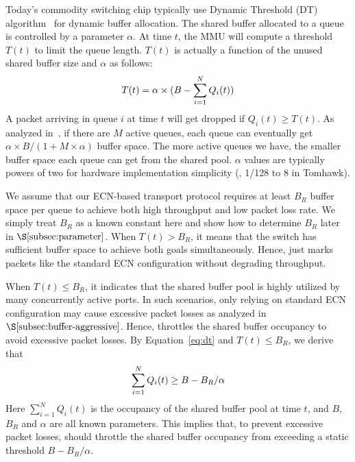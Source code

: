 Today's commodity switching chip typically use Dynamic Threshold (DT) algorithm~\cite{dt} for dynamic buffer allocation. The shared buffer allocated to a queue is controlled by a parameter $\alpha$. At time $t$, the MMU will compute a threshold $T(t)$ to limit the queue length. $T(t)$ is actually a function of the unused shared buffer size and $\alpha$ as follows:
\vspace{-3mm}
\begin{equation}
\vspace{-2mm}
T(t)=\alpha\times(B-\displaystyle\sum_{i=1}^{N} Q_{i}(t))\label{eq:dt}
\vspace{-1mm}
\end{equation}
A packet arriving in queue $i$ at time $t$ will get dropped if $Q_{i}(t)\geq T(t)$. As analyzed in~\cite{dt}, if there are $M$ active queues, each queue can eventually get $\alpha\times B/(1+M\times \alpha)$ buffer space. The more active queues we have, the smaller buffer space each queue can get from the shared pool. $\alpha$ values are typically powers of two for hardware implementation simplicity (\eg, 1/128 to 8 in Tomhawk).

We assume that our ECN-based transport protocol requires at least $B_R$ buffer space per queue to achieve both high throughput and low packet loss rate. We simply treat $B_R$ as a known constant here and show how to determine $B_R$ later in $\S\ref{subsec:parameter}$. When $T(t) > B_R$, it means that the switch has sufficient buffer space to achieve both goals simultaneously. Hence, \sys just marks packets like the standard ECN configuration without degrading throughput.

When $T(t) \leq B_R$, it indicates that the shared buffer pool is highly utilized by many concurrently active ports. In such scenarios, only relying on standard ECN configuration may cause excessive packet losses as analyzed in $\S\ref{subsec:buffer-aggressive}$. Hence, \sys throttles the shared buffer occupancy to avoid excessive packet losses. By Equation~\ref{eq:dt} and $T(t)\leq B_R$, we derive that
\vspace{-3mm}
\begin{equation}
\vspace{-3mm}
\displaystyle\sum_{i=1}^{N} Q_{i}(t)\geq B-B_{R}/\alpha\label{eq:shared_buffer}
\vspace{-3mm}
\end{equation}
Here $\displaystyle\sum_{i=1}^{N} Q_{i}(t)$ is the occupancy of the shared buffer pool at time $t$, and $B$, $B_{R}$ and $\alpha$ are all known parameters. This implies that, to prevent excessive packet losses, \sys should throttle the shared buffer occupancy from exceeding a static threshold $B-B_{R}/\alpha$.

